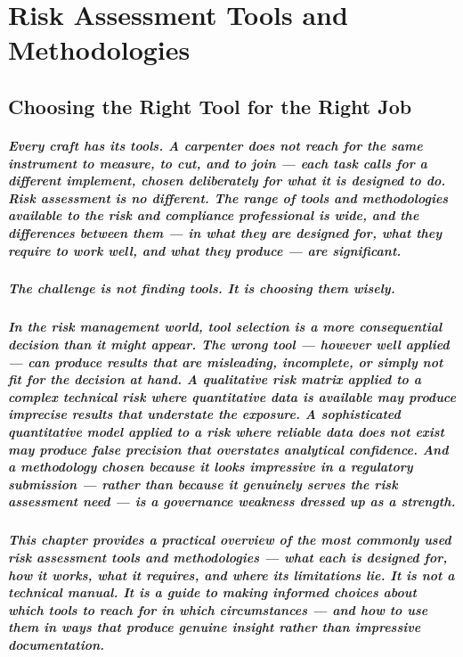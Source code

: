 \chapter{Risk Assessment Tools and Methodologies}
\label{chap:Risk Assessment Tools and Methodologies}

\section{Choosing the Right Tool for the Right Job}
\paragraph{Every craft has its tools. A carpenter does not reach for the same instrument to measure, to cut, and to join — each task calls for a different implement, chosen deliberately for what it is designed to do. Risk assessment is no different. The range of tools and methodologies available to the risk and compliance professional is wide, and the differences between them — in what they are designed for, what they require to work well, and what they produce — are significant.}
\paragraph{The challenge is not finding tools. It is choosing them wisely.}
\paragraph{In the risk management world, tool selection is a more consequential decision than it might appear. The wrong tool — however well applied — can produce results that are misleading, incomplete, or simply not fit for the decision at hand. A qualitative risk matrix applied to a complex technical risk where quantitative data is available may produce imprecise results that understate the exposure. A sophisticated quantitative model applied to a risk where reliable data does not exist may produce false precision that overstates analytical confidence. And a methodology chosen because it looks impressive in a regulatory submission — rather than because it genuinely serves the risk assessment need — is a governance weakness dressed up as a strength.}
\paragraph{This chapter provides a practical overview of the most commonly used risk assessment tools and methodologies — what each is designed for, how it works, what it requires, and where its limitations lie. It is not a technical manual. It is a guide to making informed choices about which tools to reach for in which circumstances — and how to use them in ways that produce genuine insight rather than impressive documentation.}

